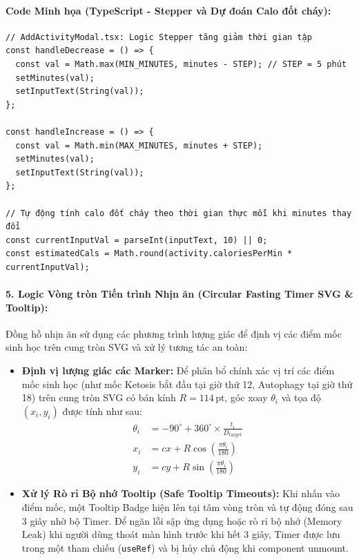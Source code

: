 \documentclass[12pt,a4paper]{article}
\begin{document}
\paragraph{Code Minh họa (TypeScript - Stepper và Dự đoán Calo đốt cháy):}
\begin{verbatim}
// AddActivityModal.tsx: Logic Stepper tăng giảm thời gian tập
const handleDecrease = () => {
  const val = Math.max(MIN_MINUTES, minutes - STEP); // STEP = 5 phút
  setMinutes(val);
  setInputText(String(val));
};

const handleIncrease = () => {
  const val = Math.min(MAX_MINUTES, minutes + STEP);
  setMinutes(val);
  setInputText(String(val));
};

// Tự động tính calo đốt cháy theo thời gian thực mỗi khi minutes thay đổi
const currentInputVal = parseInt(inputText, 10) || 0;
const estimatedCals = Math.round(activity.caloriesPerMin * currentInputVal);
\end{verbatim}

\paragraph{5. Logic Vòng tròn Tiến trình Nhịn ăn (Circular Fasting Timer SVG \& Tooltip):}
Đồng hồ nhịn ăn sử dụng các phương trình lượng giác để định vị các điểm mốc sinh học trên cung tròn SVG và xử lý tương tác an toàn:
\begin{itemize}
    \item \textbf{Định vị lượng giác các Marker:} Để phân bổ chính xác vị trí các điểm mốc sinh học (như mốc Ketosis bắt đầu tại giờ thứ 12, Autophagy tại giờ thứ 18) trên cung tròn SVG có bán kính $R = 114\,\text{pt}$, góc xoay $\theta_i$ và tọa độ $(x_i, y_i)$ được tính như sau:
    \begin{align}
        \theta_i &= -90^\circ + 360^\circ \times \frac{t_i}{D_{\text{target}}} \\
        x_i &= cx + R \cos\left(\frac{\pi \theta_i}{180}\right) \\
        y_i &= cy + R \sin\left(\frac{\pi \theta_i}{180}\right)
    \end{align}
    \item \textbf{Xử lý Rò rỉ Bộ nhớ Tooltip (Safe Tooltip Timeouts):} Khi nhấn vào điểm mốc, một Tooltip Badge hiện lên tại tâm vòng tròn và tự động đóng sau 3 giây nhờ bộ Timer. Để ngăn lỗi sập ứng dụng hoặc rò rỉ bộ nhớ (Memory Leak) khi người dùng thoát màn hình trước khi hết 3 giây, Timer được lưu trong một tham chiếu (\texttt{useRef}) và bị hủy chủ động khi component unmount.
\end{itemize}
\end{document}
